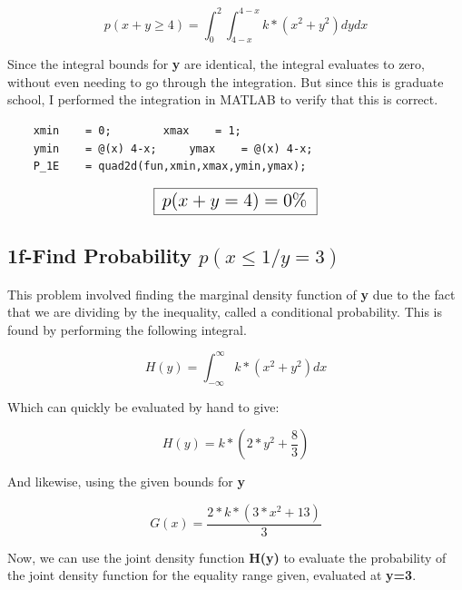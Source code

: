 \documentclass[]{article}
\begin{document}
\begin{displaymath}
	p(x+y \ge 4 )  = \int_0^2{\int_{4-x}^{4-x}{k*(x^2+y^2)   dy} dx}
\end{displaymath}   
	 
\noindent Since the integral bounds for {\bf y} are identical, the integral evaluates to zero, without even needing to go through the integration. But since this is graduate school, I performed the integration in MATLAB to verify that this is correct. 

\begin{lstlisting}
	xmin    = 0;		xmax    = 1;
	ymin    = @(x) 4-x; 	ymax    = @(x) 4-x;
	P_1E    = quad2d(fun,xmin,xmax,ymin,ymax);
\end{lstlisting}

\begin{displaymath}
	\fbox {   \Large $p(x+y = 4 )  = 0\%$  }
\end{displaymath}  






\subsection*{1f-Find Probability $ p(x \le 1/ y=3 )   $}

This problem involved finding the marginal density function of {\bf y} due to the fact that we are dividing by the inequality, called a conditional probability. This is found by performing the following integral.

\begin{displaymath}
	H(y)= \int_{-\infty}^{\infty}{k*(x^2+y^2)   dx} 
\end{displaymath} 

\noindent Which can quickly be evaluated by hand to give:

\begin{equation}
	H(y)= k*(2*y^2 + \frac{8}{3})
\end{equation} 

\noindent And likewise, using the given bounds for {\bf y}

\begin{equation}
	G(x)= \frac{2*k*(3*x^2 + 13)}{3}
\end{equation} 

\noindent Now, we can use the joint density function {\bf H(y)} to evaluate the probability of the joint density function for the equality range given, evaluated at {\bf y=3}.
\end{document}
